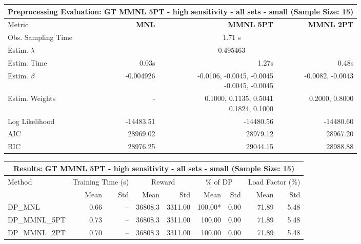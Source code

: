 
\begin{samepage}
\begin{center}
  \small
  \begin{tabular}{l|r|r|r}
    \toprule
    \multicolumn{4}{c}{\textbf{Preprocessing Evaluation: GT MMNL 5PT - high sensitivity - all sets - small (Sample Size: 15)}} \\
    \midrule
    Metric & \textbf{MNL} & \textbf{MMNL 5PT} & \textbf{MMNL 2PT} \\
    \midrule
    Obs. Sampling Time & \multicolumn{3}{c}{1.71 s} \\
    Estim. $\lambda$ & \multicolumn{3}{c}{0.495463} \\
    Estim. Time & 0.03s & 1.27s & 0.48s \\
    Estim. $\beta$ & -0.004926 & \makecell[tr]{-0.0106, -0.0045, -0.0045 \\ -0.0045, -0.0045} & -0.0082, -0.0043 \\
    Estim. Weights & - & \makecell[tr]{0.1000, 0.1135, 0.5041 \\ 0.1824, 0.1000} & 0.2000, 0.8000 \\
    Log Likelihood & -14483.51 & -14480.56 & -14480.60 \\
    AIC & 28969.02 & 28979.12 & 28967.20 \\
    BIC & 28976.25 & 29044.15 & 28988.88 \\
    \bottomrule
  \end{tabular}
\end{center}
\begin{center}
  \small
  \begin{tabular}{l|rr|rr|rr|rr}
    \toprule
    \multicolumn{9}{c}{\textbf{Results: GT MMNL 5PT - high sensitivity - all sets - small (Sample Size: 15)}} \\
    \midrule
    Method & \multicolumn{2}{c|}{Training Time (s)} & \multicolumn{2}{c|}{Reward} & \multicolumn{2}{c|}{\% of DP} & \multicolumn{2}{c}{Load Factor (\%)} \\
    & Mean & Std & Mean & Std & Mean & Std & Mean & Std \\
    \midrule
    DP\_MNL      &     0.66 &    -- &    36808.3 &    3311.00 & 100.00* &    0.00 &   71.89 &    5.48 \\
    DP\_MMNL\_5PT &     0.73 &    -- &    36808.3 &    3311.00 &  100.00 &    0.00 &   71.89 &    5.48 \\
    DP\_MMNL\_2PT &     0.70 &    -- &    36808.3 &    3311.00 &  100.00 &    0.00 &   71.89 &    5.48 \\

\end{tabular}
\end{center}
\end{samepage}

